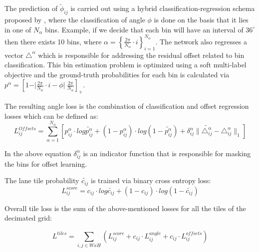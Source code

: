              The prediction of $\widetilde{\phi}_{ij}$ is carried out using a hybrid classification-regression schema proposed by \cite{DBLP:journals/corr/abs-1805-03225}, where the classification of angle $\phi$ is done on the basis that it lies in one of $N_{\alpha}$ bins. Example, if we decide that each bin will have an interval of $36^{\circ}$ then there exists 10 bins, where $\alpha = \left\{\frac{2\pi}{N_{\alpha} } \cdot i \right\}^{N_{\alpha}}_{i =1} $. The network also regresses a vector $\triangle^{\alpha}$ which is responsible for addressing the residual offset related to bin classification. This bin estimation problem is optimized using a soft multi-label objective and the ground-truth probabilities for each bin is calculated via $ p^{\alpha} = [1 - \vert \frac{2\pi}{N_{\alpha}} \cdot i  - \phi  \vert \ \frac{2\pi}{N_{\alpha}} ]_{+}$.
             
             The resulting angle loss is the combination of classification and offset regression losses which can be defined as:
             \begin{equation}
                 L_{ij}^{Offsets} = \sum_{\alpha=1}^{N_{\alpha}}[p^{\alpha}_{ij} \cdot log \tilde{p^{\alpha}_{ij}} + (1 - p^{\alpha}_{ij}) \cdot log(1 - \tilde{p^{\alpha}_{ij}}) + \delta^{\alpha}_{ij} \parallel   \tilde{\triangle^{\alpha}_{ij}} - \triangle^{\alpha}_{ij} \parallel_{1} ]
             \end{equation}
             
             In the above equation $\delta^{\alpha}_{ij}$ is an indicator function that is responsible for masking the bins for offset learning. 
             
             The lane tile probability $\widetilde{c_{ij}}$ is trained via binary cross entropy loss:
             \begin{equation}
                 L_{ij}^{score} = c_{ij} \cdot log \widetilde{c_{ij}} + (1 - c_{ij}) \cdot log
                    (1-  \widetilde{c_{ij}})
             \end{equation}
             
             Overall tile loss is the sum of the above-mentioned losses for all the tiles of the decimated grid:
             
            \begin{equation}
                L^{tiles} = \sum_{i,j \in WxH}(L^{score}_{ij} +c_{ij} \cdot L^{angle}_{ij} + c_{ij} \cdot L^{offsets}_{ij}  )
            \end{equation}
            
